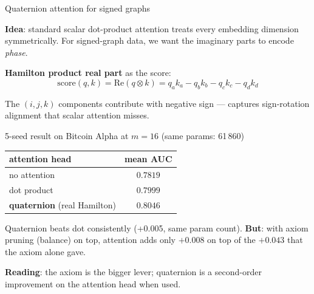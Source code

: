 \documentclass[10pt,aspectratio=169]{beamer}
\begin{document}
\begin{frame}{Quaternion attention for signed graphs}

\textbf{Idea}: standard scalar dot-product attention treats every
embedding dimension symmetrically. For signed-graph data, we want
the imaginary parts to encode \emph{phase}.

\medskip

\textbf{Hamilton product real part} as the score:
\[
\mathrm{score}(q, k) = \mathrm{Re}(q \otimes k) =
q_a k_a - q_b k_b - q_c k_c - q_d k_d
\]

The $(i, j, k)$ components contribute with negative sign --- captures
sign-rotation alignment that scalar attention misses.

\medskip

\begin{block}{5-seed result on Bitcoin Alpha at $m{=}16$ (same params: 61\,860)}
\begin{center}
\begin{tabular}{l c}
\toprule
attention head & mean AUC \\
\midrule
no attention             & $0.7819$ \\
dot product              & $0.7999$ \\
\textbf{quaternion} (real Hamilton)  & $\mathbf{0.8046}$ \\
\bottomrule
\end{tabular}
\end{center}
\end{block}

Quaternion beats dot consistently (+0.005, same param count).
\textbf{But}: with axiom pruning (balance) on top, attention adds only
$+0.008$ on top of the $+0.043$ that the axiom alone gave.

\textbf{Reading}: the axiom is the bigger lever; quaternion is a
second-order improvement on the attention head when used.
\end{frame}
\end{document}

